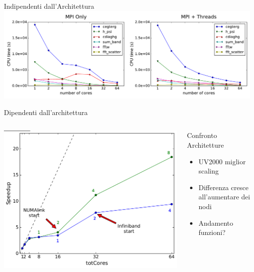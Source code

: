 \documentclass[8pt]{beamer}
\begin{document}
\begin{frame}{Indipendenti dall'Architettura}
	\includegraphics[width=1\textwidth]{threads_comparison.pdf}	
\end{frame}



\begin{frame}{Dipendenti dall'architettura}
\begin{columns}
			\includegraphics[width=1\textwidth]{beam_arch_global.jpg}			
		\begin{block}{Confronto Architetture}
			\begin{itemize}
				\item UV2000 miglior scaling
				\item Differenza cresce all'aumentare dei nodi
				\item Andamento funzioni?		
			\end{itemize}
		\end{block}
\end{columns}
\end{frame}
\end{document}
